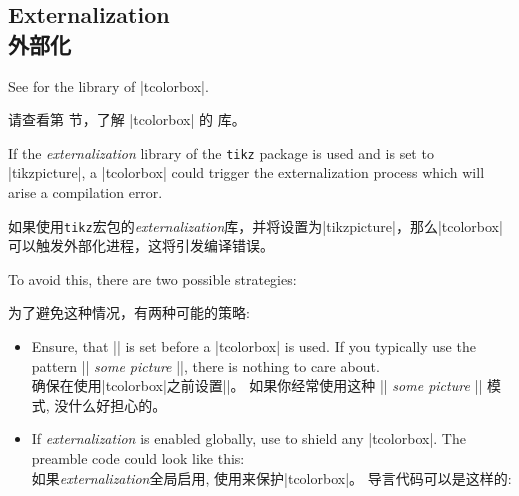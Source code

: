 \setcounter{section}{4}
\setcounter{subsection}{22}
\setcounter{subsubsection}{0}

\subsection{Externalization\\外部化}

\begin{marker}
See  for the  library of |tcolorbox|.

请查看第  节，了解 |tcolorbox| 的  库。
\end{marker}

If the \emph{externalization} library of the \texttt{tikz} package is used
and  is set to |tikzpicture|,
a |tcolorbox| could trigger the externalization process which will arise
a compilation error.

如果使用\texttt{tikz}宏包的\emph{externalization}库，并将设置为|tikzpicture|，那么|tcolorbox|可以触发外部化进程，这将引发编译错误。



To avoid this, there are two possible strategies:

为了避免这种情况，有两种可能的策略:
\begin{itemize}
\item 
Ensure, that |\tikzexternaldisable| is set before a |tcolorbox| is used.
If you typically use the pattern |\tikzexternalenable| \textit{some picture} |\tikzexternaldisable|,
there is nothing to care about.
\\确保在使用|tcolorbox|之前设置|\tikzexternaldisable|。%
如果你经常使用这种 |\tikzexternalenable| \textit{some picture} |\tikzexternaldisable| 模式,
没什么好担心的。
\item 
If \emph{externalization} is enabled globally, use  to
shield any |tcolorbox|. The preamble code could look like this:
\\如果\emph{externalization}全局启用, 使用来保护|tcolorbox|。%
导言代码可以是这样的:
\begin{dispListing}
\usetikzlibrary{external}
\tikzexternalize
{}
\end{dispListing}
\end{itemize}

